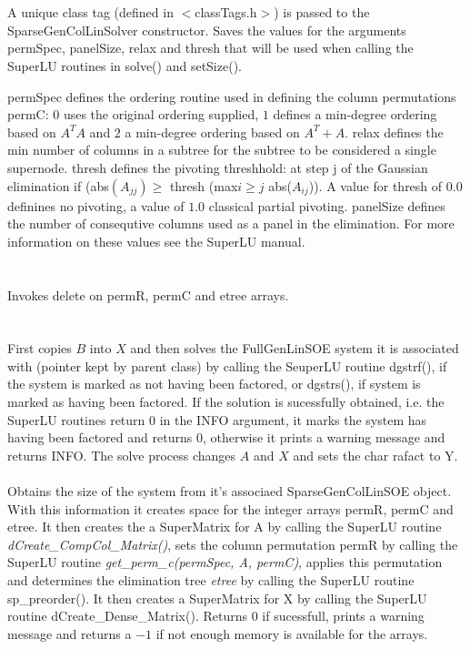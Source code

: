  \\
  \\
A unique class tag (defined in $<$classTags.h$>$) is passed to the
SparseGenColLinSolver constructor. Saves the values for the arguments
\p permSpec, \p panelSize, \p relax and \p thresh that
will be used when calling the SuperLU routines in solve() and
setSize().

\p permSpec defines the ordering routine used in defining the
column permutations \p permC: $0$ uses the original ordering
supplied, $1$ defines a min-degree ordering based on $A^TA$ and $2$ a
min-degree ordering based on $A^T + A$. \p relax defines the min
number of columns in a subtree for the subtree to be considered a
single supernode. \p thresh defines the pivoting threshhold: at
step j of the Gaussian elimination if (abs$(A_{jj}) \ge$ \p thresh
(max$ i \ge j$ abs($A_{ij}$)). A value for \p thresh of $0.0$
definines no pivoting, a value of $1.0$ classical partial pivoting.
\p panelSize defines the number of consequtive columns used as a
panel in the elimination. For more information on these values see the
SuperLU manual. \\


 \\
\\ 
Invokes delete on \p permR, \p permC and \p etree arrays. \\


  \\
 \\
First copies $B$ into $X$ and then solves the FullGenLinSOE system 
it is associated with (pointer kept by parent class) by calling the SeuperLU
routine dgstrf(), if the system is marked as not having been factored,
or dgstrs(), if system is marked as having been factored. If the
solution is sucessfully obtained, i.e. the SuperLU routines return $0$
in the INFO argument, it marks the system has having been
factored and returns $0$, otherwise it prints a warning message and
returns INFO. The solve process changes $A$ and $X$ and sets the char
\p rafact to \p Y. \\   

 \\
Obtains the size of the system from it's associaed SparseGenColLinSOE
object. With this information it creates space for the integer arrays
\p permR, \p permC and \p etree. It then creates the
a SuperMatrix for A by calling the SuperLU routine {\em
dCreate\_CompCol\_Matrix()}, sets the column permutation \p permR
by calling the SuperLU routine {\em get\_perm\_c(permSpec, A, permC)},
applies this permutation and determines the elimination tree {\em
etree} by calling the SuperLU routine sp\_preorder(). It then
creates a SuperMatrix for X by calling the SuperLU routine 
dCreate\_Dense\_Matrix().
Returns $0$ if sucessfull, prints a warning message and returns
a $-1$ if not enough memory is available for the arrays. \\


